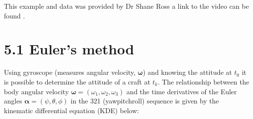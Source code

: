 \documentclass[letterpaper,10pt,english]{jupyterBook}
\begin{document}
\sphinxAtStartPar
This example and data was provided by Dr Shane Ross a link to the video can be found .


\section{5.1 Euler’s method}
\label{\detokenize{5IMU:euler-s-method}}
\sphinxAtStartPar
Using gyroscope (measures angular velocity, \(\boldsymbol{\omega}\)) and knowing the attitude at \(t_0\) it is possible to determine the attitude of a craft at \(t_k\). The relationship between the body angular velocity \(\boldsymbol{\omega} = (\omega_1, \omega_2, \omega_3)\) and the time derivatives of the Euler angles \(\boldsymbol{\alpha} = (\psi, \theta, \phi)\) in the 3\sphinxhyphen{}2\sphinxhyphen{}1 (yaw\sphinxhyphen{}pitch\sphinxhyphen{}roll) sequence is given by the kinematic differential equation (KDE) below:
\end{document}
